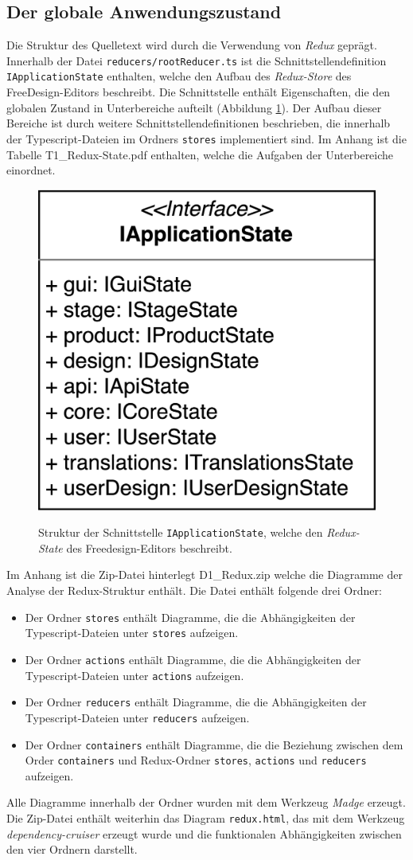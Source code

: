 \subsection{Der globale Anwendungszustand}
Die Struktur des Quelletext wird durch die Verwendung von \emph{Redux} geprägt. Innerhalb der Datei \lstinline|reducers/rootReducer.ts| ist die Schnittstellendefinition \lstinline|IApplicationState| enthalten, welche den Aufbau des \emph{Redux-Store} des FreeDesign-Editors beschreibt. Die Schnittstelle enthält Eigenschaften, die den globalen Zustand in Unterbereiche aufteilt (Abbildung \ref{fig:IApplicationState}). Der Aufbau dieser Bereiche ist durch weitere Schnittstellendefinitionen beschrieben, die innerhalb der Typescript-Dateien im Ordners \lstinline|stores| implementiert sind. 
Im Anhang ist die Tabelle T1\_Redux-State.pdf enthalten, welche die Aufgaben der Unterbereiche einordnet. 


\begin{figure}[H]
    \centering
    \caption{Struktur der Schnittstelle \lstinline|IApplicationState|, welche den \emph{Redux-State} des Freedesign-Editors beschreibt.}
    \includegraphics[width=.3\textwidth]{diagrams/Ist-Architektur/IApplicationState.png}
    \label{fig:IApplicationState}
\end{figure}


Im Anhang ist die Zip-Datei hinterlegt D1\_Redux.zip welche die Diagramme der Analyse der Redux-Struktur enthält.
Die Datei enthält folgende drei Ordner:  
\begin{itemize}
    \item Der Ordner \lstinline|stores| enthält Diagramme, die die Abhängigkeiten der Typescript-Dateien unter \lstinline|stores| aufzeigen.
    \item Der Ordner \lstinline|actions| enthält Diagramme, die die Abhängigkeiten der Typescript-Dateien unter \lstinline|actions| aufzeigen.
    \item Der Ordner \lstinline|reducers| enthält Diagramme, die die Abhängigkeiten der Typescript-Dateien unter \lstinline|reducers| aufzeigen. 
    \item Der Ordner \lstinline|containers| enthält Diagramme, die die Beziehung zwischen dem Order \lstinline|containers| und Redux-Ordner \lstinline|stores|, \lstinline|actions| und \lstinline|reducers| aufzeigen.
\end{itemize}
Alle Diagramme innerhalb der Ordner wurden mit dem Werkzeug \emph{Madge} erzeugt.
Die Zip-Datei enthält weiterhin das Diagram \lstinline|redux.html|, das mit dem Werkzeug \emph{dependency-cruiser} erzeugt wurde und die funktionalen Abhängigkeiten zwischen den vier Ordnern darstellt.

